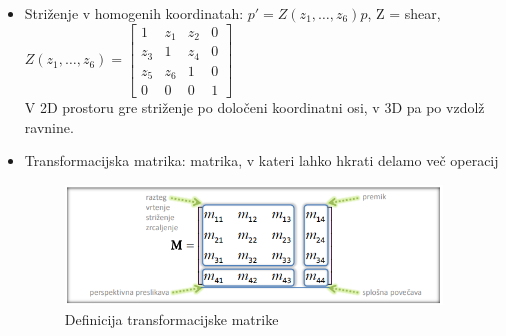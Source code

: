 \documentclass{article}
\begin{document}
\begin{itemize}
    \item Striženje v homogenih koordinatah: $p' = Z(z_1,\dots,z_6)p$, Z = shear, $Z(z_1,\dots,z_6) = \begin{bmatrix} 1 & z_1 & z_2 & 0 \\ z_3 & 1 & z_4 & 0 \\ z_5 & z_6 & 1 & 0 \\ 0 & 0 & 0 & 1 \end{bmatrix}$ \\ V 2D prostoru gre striženje po določeni koordinatni osi, v 3D pa po vzdolž ravnine.
    \item Transformacijska matrika: matrika, v kateri lahko hkrati delamo več operacij
    \begin{figure}[H]
    \centering
    \includegraphics[width=100mm]{src/transformacijska_matrika.png}
    \caption{Definicija transformacijske matrike}
    \end{figure}   
\end{itemize}
\end{document}
